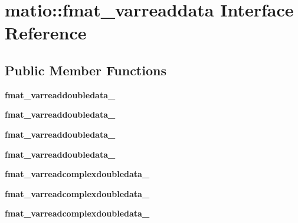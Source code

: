 \hypertarget{interfacematio_1_1fmat__varreaddata}{}\section{matio\+:\+:fmat\+\_\+varreaddata Interface Reference}
\label{interfacematio_1_1fmat__varreaddata}
\subsection*{Public Member Functions}
\begin{DoxyCompactItemize}
\item 
\mbox{\label{interfacematio_1_1fmat__varreaddata_ad4af274ecc0e48f338261d921d15626e}} 
{\bfseries fmat\+\_\+varreaddoubledata\+\_}
\item 
\mbox{\label{interfacematio_1_1fmat__varreaddata_abcad34406fbdb83f6efbf95145494dbb}} 
{\bfseries fmat\+\_\+varreaddoubledata\+\_}
\item 
\mbox{\label{interfacematio_1_1fmat__varreaddata_acca32319cd7005dce820b9caff90067b}} 
{\bfseries fmat\+\_\+varreaddoubledata\+\_}
\item 
\mbox{\label{interfacematio_1_1fmat__varreaddata_a61044fa4218ebfe0b9eddd57fdbfd2e7}} 
{\bfseries fmat\+\_\+varreaddoubledata\+\_}
\item 
\mbox{\label{interfacematio_1_1fmat__varreaddata_af2f1d9ee3c2ee087951fbf9f793e2cda}} 
{\bfseries fmat\+\_\+varreadcomplexdoubledata\+\_}
\item 
\mbox{\label{interfacematio_1_1fmat__varreaddata_a0381e2bcaee73cc71120ea77575b956c}} 
{\bfseries fmat\+\_\+varreadcomplexdoubledata\+\_}
\item 
\mbox{\label{interfacematio_1_1fmat__varreaddata_a204721d9935535f0c4ed7ed18316d366}} 
{\bfseries fmat\+\_\+varreadcomplexdoubledata\+\_}
\item 
\mbox{\label{interfacematio_1_1fmat__varreaddata_a75ed92a5c6c5040a500a1ba7464f1cb0}} 

\end{DoxyCompactItemize}
